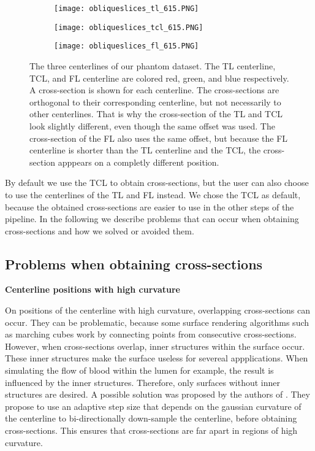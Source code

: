 \documentclass[thesis.tex]{subfiles}
\begin{document}
\begin{figure}
	\begin{subfigure}[t]{0.45\textwidth}
		\texttt{[image: obliqueslices\_tl\_615.PNG]}
	\caption{}		
	\end{subfigure}
\hspace{0.05\textwidth}
	\begin{subfigure}[t]{0.45\textwidth}
		\texttt{[image: obliqueslices\_tcl\_615.PNG]}		
\caption{}	
	\end{subfigure}
\centering
\begin{subfigure}[t]{0.45\textwidth}
		\texttt{[image: obliqueslices\_fl\_615.PNG]}		
\caption{}	
	\end{subfigure}
	\caption{The three centerlines of our phantom dataset. The TL centerline, TCL, and FL centerline are colored red, green, and blue respectively. A cross-section is shown for each centerline. The cross-sections are orthogonal to their corresponding centerline, but not necessarily to other centerlines. That is why the cross-section of the TL and TCL look slightly different, even though the same offset was used. The cross-section of the FL also uses the same offset, but because the FL centerline is shorter than the TL centerline and the TCL, the cross-section apppears on a completly different position.}
\label{fig:obliqueslices}
\end{figure}



By default we use the TCL to obtain cross-sections, but the user can also choose to use the centerlines of the TL and FL instead. We chose the TCL as default, because the obtained cross-sections are easier to use in the other steps of the pipeline.
In the following we describe problems that can occur when obtaining cross-sections and how we solved or avoided them. 

\subsection{Problems when obtaining cross-sections}
\label{problems_crosssections}
\textbf{Centerline positions with high curvature} 

On positions of the centerline with high curvature, overlapping cross-sections can occur. They can be problematic, because some surface rendering algorithms such as marching cubes work by connecting points from consecutive cross-sections. However, when cross-sections overlap, inner structures within the surface occur. These inner structures make the surface useless for severeal appplications. When simulating the flow of blood within the lumen for example, the result is influenced by the inner structures. Therefore, only surfaces without inner structures are desired. A possible solution was proposed by the authors of \cite{wu2010curvature}. They propose to use an adaptive step size that depends on the gaussian curvature of the centerline to bi-directionally down-sample the centerline, before obtaining cross-sections. This ensures that cross-sections are far apart in regions of high curvature. 
\end{document}
